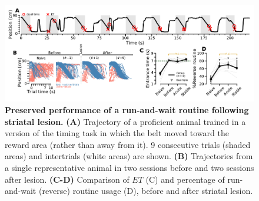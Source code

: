 \begin{figure}[bth!]
	\begin{center}
	   \includegraphics[width=\textwidth]{ch-lesion/figures/ReverseTreadmill.pdf}
	   \caption
	   {\textbf{Preserved performance of a run-and-wait routine following striatal lesion.}
	   \textbf{(A)} Trajectory of a proficient animal trained in a version of the timing task in which the belt moved toward the reward area (rather than away from it). 9 consecutive trials (shaded areas) and intertrials (white areas) are shown.
	   \textbf{(B)} Trajectories from a single representative animal in two sessions before and two sessions after lesion.
	   \textbf{(C-D)} Comparison of $ET$ (C) and percentage of run-and-wait (reverse) routine usage (D), before and after striatal lesion.
	   }
	   \label{fig:lesion:rev}
	\end{center}
\end{figure}